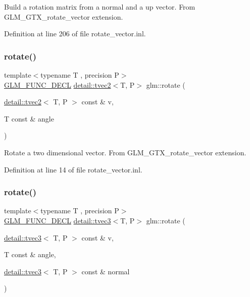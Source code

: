Build a rotation matrix from a normal and a up vector. From G\+L\+M\+\_\+\+G\+T\+X\+\_\+rotate\+\_\+vector extension. 

Definition at line 206 of file rotate\+\_\+vector.\+inl.

\mbox{\label{group__gtx__rotate__vector_ga5520f6dd671807ec62a8f97c00c1b78b}} 
\subsubsection{\texorpdfstring{rotate()}{rotate()}\hspace{0.1cm}{\footnotesize\ttfamily [1/3]}}
{\footnotesize\ttfamily template$<$typename T , precision P$>$ \\
\hyperlink{setup_8hpp_ab2d052de21a70539923e9bcbf6e83a51}{G\+L\+M\+\_\+\+F\+U\+N\+C\+\_\+\+D\+E\+CL} \hyperlink{structglm_1_1detail_1_1tvec2}{detail\+::tvec2}$<$T, P$>$ glm\+::rotate (\begin{DoxyParamCaption}\item[{\hyperlink{structglm_1_1detail_1_1tvec2}{detail\+::tvec2}$<$ T, P $>$ const \&}]{v,  }\item[{T const \&}]{angle }\end{DoxyParamCaption})}

Rotate a two dimensional vector. From G\+L\+M\+\_\+\+G\+T\+X\+\_\+rotate\+\_\+vector extension. 

Definition at line 14 of file rotate\+\_\+vector.\+inl.

\mbox{\label{group__gtx__rotate__vector_ga4eccdf3769ce3b5d1e4018394290f88c}} 
\subsubsection{\texorpdfstring{rotate()}{rotate()}\hspace{0.1cm}{\footnotesize\ttfamily [2/3]}}
{\footnotesize\ttfamily template$<$typename T , precision P$>$ \\
\hyperlink{setup_8hpp_ab2d052de21a70539923e9bcbf6e83a51}{G\+L\+M\+\_\+\+F\+U\+N\+C\+\_\+\+D\+E\+CL} \hyperlink{structglm_1_1detail_1_1tvec3}{detail\+::tvec3}$<$T, P$>$ glm\+::rotate (\begin{DoxyParamCaption}\item[{\hyperlink{structglm_1_1detail_1_1tvec3}{detail\+::tvec3}$<$ T, P $>$ const \&}]{v,  }\item[{T const \&}]{angle,  }\item[{\hyperlink{structglm_1_1detail_1_1tvec3}{detail\+::tvec3}$<$ T, P $>$ const \&}]{normal }\end{DoxyParamCaption})}

